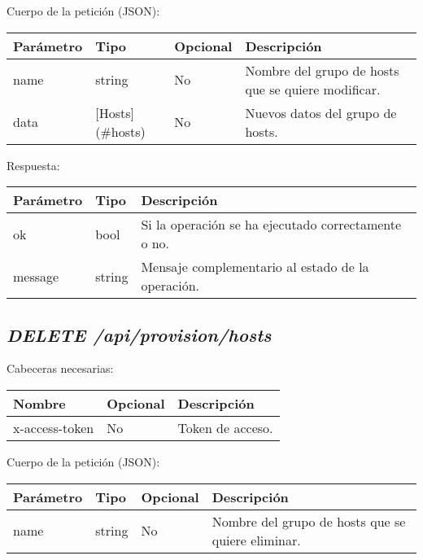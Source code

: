 Cuerpo de la petición (JSON):
\begin{table}[!h]
	\centering
	\begin{adjustbox}{max width=\textwidth}
	\begin{tabular}{|l|l|l|l|}
		\hline
		Parámetro & Tipo & Opcional & Descripción \\ \hline
		name & string & No & Nombre del grupo de hosts que se quiere modificar. \\ \hline
		data & [Hosts](\#hosts) & No & Nuevos datos del grupo de hosts. \\ \hline
	\end{tabular}
\end{adjustbox}
\end{table}


Respuesta:
\begin{table}[!h]
	\centering
	\begin{adjustbox}{max width=\textwidth}
	\begin{tabular}{|l|l|l|}
		\hline
		Parámetro & Tipo & Descripción \\ \hline
		ok & bool & Si la operación se ha ejecutado correctamente o no. \\ \hline
		message & string & Mensaje complementario al estado de la operación. \\ \hline
	\end{tabular}
\end{adjustbox}
\end{table}

\subsection{\textit{DELETE /api/provision/hosts}}

Cabeceras necesarias:
\begin{table}[h!]
	\centering
	\begin{adjustbox}{max width=\textwidth}
	\begin{tabular}{|l|l|l|}
		\hline
		Nombre & Opcional & Descripción \\ \hline
		x-access-token & No & Token de acceso. \\ \hline
	\end{tabular}
\end{adjustbox}
\end{table}

Cuerpo de la petición (JSON):
\begin{table}[!h]
	\centering
	\begin{adjustbox}{max width=\textwidth}
	\begin{tabular}{|l|l|l|l|}
		\hline
		Parámetro & Tipo & Opcional & Descripción \\ \hline
		name & string & No & Nombre del grupo de hosts que se quiere eliminar. \\ \hline
	\end{tabular}
\end{adjustbox}
\end{table}

